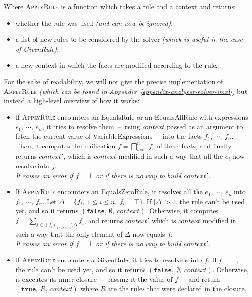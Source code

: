 \documentclass[11pt]{article}
\begin{document}
Where \textsc{ApplyRule} is a function which takes a rule and a context and returns:
\begin{itemize}[noitemsep]
    \item whether the rule was used \textit{(and can now be ignored)};
    \item a list of new rules to be considered by the solver \textit{(which is useful in the case of \textsf{GivenRule})};
    \item a new context in which the facts are modified according to the rule.\\
\end{itemize}

For the sake of readability, we will not give the precise implementation of \textsc{ApplyRule} \textit{(which can be found in Appendix~\ref{appendix-analyser-solver-impl})} but instead a high-level overview of how it works:
\begin{itemize}
    \item If \textsc{ApplyRule} encounters an \textsf{EqualsRule} or an \textsf{EqualsAllRule} with expressions $e_1,\ \cdots,\ e_n$, it tries to resolve them~--~using $context$ passed as an argument to fetch the current value of \textsf{VariableExpression}s~--~into the facts $f_1,\ \cdots,\ f_n$. Then, it computes the unification $f = \bigsqcap_{i=1}^n f_i$ of these facts, and finally returns $context'$, which is $context$ modified in such a way that all the $e_i$ now resolve into $f$.\\ \textit{It raises an error if $f = \bot$ or if there is no way to build $context'$}.
    \item If \textsc{ApplyRule} encounters an \textsf{EqualsZeroRule}, it resolves all the $e_1,\ \cdots,\ e_n$ into $f_1,\ \cdots,\ f_n$. Let $\Delta = \{f_i,\ 1 \leq i \leq n,\ f_i = \top\}$. If $|\Delta| > 1$, the rule can't be used yet, and so it returns $(\texttt{false},\ \emptyset,\ context)$. Otherwise, it computes $f = \sum_{f \in (f_i)_{1 \leq i \leq n} \setminus \Delta} f_i$, and returns $context'$ which is $context$ modified in such a way that the only element of $\Delta$ now equals $f$.\\ \textit{It raises an error if $f = \bot$ or if there is no way to build $context'$}.
    \item If \textsc{ApplyRule} encounters a \textsf{GivenRule}, it tries to resolve $e$ into $f$. If $f = \top$, the rule can't be used yet, and so it returns $(\texttt{false},\ \emptyset,\ context)$. Otherwise, it executes its inner closure~--~passing it the value of $f$~--~and return $(\texttt{true},\ R,\ context)$ where $R$ are the rules that were declared in the closure.\\
\end{itemize}
\end{document}
